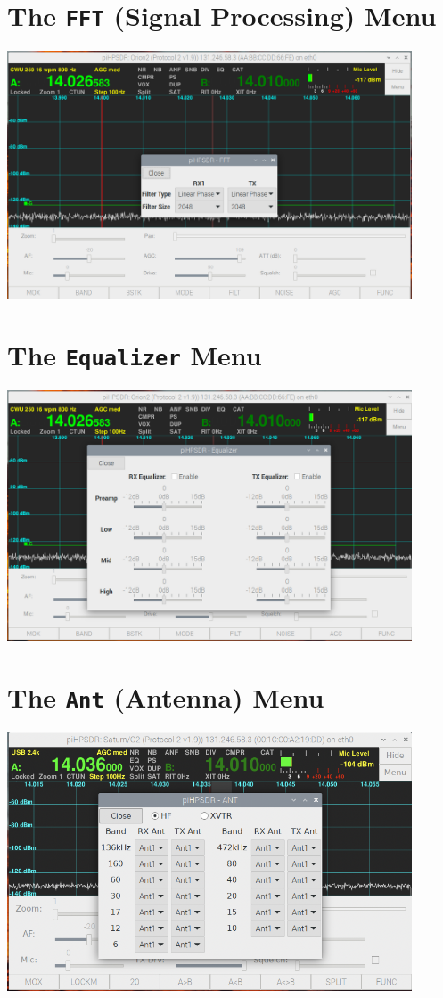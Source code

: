 \documentclass[12pt]{book}
\begin{document}
\section{The \texttt{FFT} (Signal Processing) Menu}
\begin{center}
\includegraphics[width=12cm]{FFTMenu.png}
\end{center}

\section{The \texttt{Equalizer} Menu}
\begin{center}
\includegraphics[width=12cm]{EqualizerMenu.png}
\end{center}

\section{The \texttt{Ant} (Antenna) Menu}
\begin{center}
\includegraphics[width=12cm]{AntMenu.png}
\end{center}
 
\end{document}
